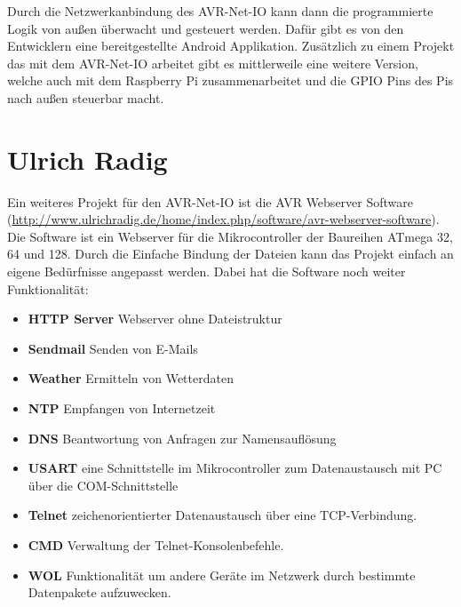 Durch die Netzwerkanbindung des AVR-Net-IO kann dann die programmierte Logik von
außen überwacht und gesteuert werden. Dafür gibt es von den Entwicklern eine
bereitgestellte Android Applikation. Zusätzlich zu einem Projekt das mit dem
AVR-Net-IO arbeitet gibt es mittlerweile eine weitere Version, welche auch mit dem
Raspberry Pi zusammenarbeitet und die GPIO Pins des Pis nach außen steuerbar
macht.

\section{Ulrich Radig}

Ein weiteres Projekt für den AVR-Net-IO ist die AVR Webserver Software
(\url{http://www.ulrichradig.de/home/index.php/software/avr-webserver-software}).
Die Software ist ein Webserver für die Mikrocontroller der Baureihen ATmega 32,
64 und 128. Durch die Einfache Bindung der Dateien kann das Projekt
einfach an eigene Bedürfnisse angepasst werden. Dabei hat die Software noch
weiter Funktionalität:

\begin{itemize}
  \item \textbf{\ac{HTTP} Server} Webserver ohne Dateistruktur
  \item \textbf{Sendmail} Senden von E-Mails
  \item \textbf{Weather} Ermitteln von Wetterdaten
  \item \textbf{\ac{NTP}} Empfangen von Internetzeit
  \item \textbf{\ac{DNS}} Beantwortung von Anfragen zur
  Namensauflösung
  \item \textbf{\ac{USART}} eine Schnittstelle im Mikrocontroller zum
  Datenaustausch mit PC über die COM-Schnittstelle
  \item \textbf{\ac{Telnet}} zeichenorientierter
  Datenaustausch über eine TCP-Verbindung.
  \item \textbf{\ac{CMD}} Verwaltung der Telnet-Konsolenbefehle.
  \item \textbf{\ac{WOL}} Funktionalität um andere Geräte im Netzwerk
  durch bestimmte Datenpakete aufzuwecken.
\end{itemize}
